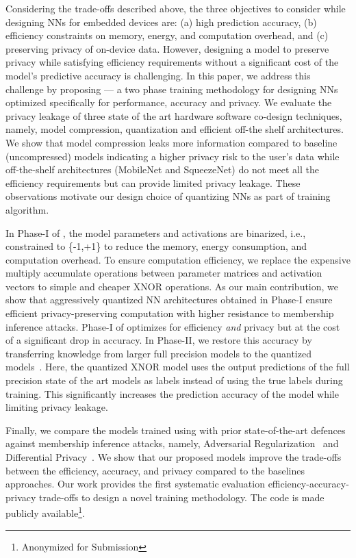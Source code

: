Considering the trade-offs described above, the three objectives to consider while designing NNs for embedded devices are: (a) high prediction accuracy, (b) efficiency constraints on memory, energy, and computation overhead, and (c) preserving privacy of on-device data.
However, designing a model to preserve privacy while satisfying efficiency requirements without a significant cost of the model’s predictive accuracy is challenging.
In this paper, we address this challenge by proposing \method\hspace{0.02in} — a two phase training methodology for designing NNs optimized specifically for performance, accuracy and privacy.
We evaluate the privacy leakage of three state of the art hardware software co-design techniques, namely, model compression, quantization and efficient off-the shelf architectures.
We show that model compression leaks more information compared to baseline (uncompressed) models indicating a higher privacy risk to the user’s data while off-the-shelf architectures (MobileNet and SqueezeNet) do not meet all the efficiency requirements but can provide limited privacy leakage.
These observations motivate our design choice of quantizing NNs as part of \method\hspace{0.02in} training algorithm.


In Phase-I of \method, the model parameters and activations are binarized, i.e., constrained to \{-1,+1\} to reduce the memory, energy consumption, and computation overhead.
To ensure computation efficiency, we replace the expensive multiply accumulate operations between parameter matrices and activation vectors to simple and cheaper XNOR operations.
As our main contribution, we show that aggressively quantized NN architectures obtained in Phase-I ensure efficient privacy-preserving computation with higher resistance to membership inference attacks.
Phase-I of \method\hspace{0.02in} optimizes for efficiency \textit{and} privacy but at the cost of a significant drop in accuracy.
In Phase-II, we restore this accuracy by transferring knowledge from larger full precision models to the quantized models~\cite{44873}.
Here, the quantized XNOR model uses the output predictions of the full precision state of the art models as labels instead of using the true labels during training.
This significantly increases the prediction accuracy of the model while limiting privacy leakage.


Finally, we compare the models trained using \method\hspace{0.02in} with prior state-of-the-art defences against membership inference attacks, namely, Adversarial Regularization~\cite{DBLP:conf/ccs/NasrSH18} and Differential Privacy~\cite{Abadi:2016:DLD:2976749.2978318}.
We show that our proposed models improve the trade-offs between the efficiency, accuracy, and privacy compared to the baselines approaches.
Our work provides the first systematic evaluation efficiency-accuracy-privacy trade-offs to design a novel training methodology.
The code is made publicly available\footnote{Anonymized for Submission}.

